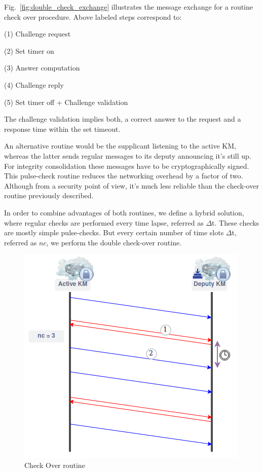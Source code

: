 Fig.~\ref{fig:double_check_exchange} illustrates the message exchange for a routine check over procedure. Above labeled steps correspond to:

\quad(1) Challenge request

\quad(2) Set timer on

\quad(3) Answer computation

\quad(4) Challenge reply

\quad(5) Set timer off + Challenge validation

The challenge validation implies both, a correct answer to the request and a response time within the set timeout.

An alternative routine would be the supplicant listening to the active KM, whereas the latter sends regular messages to its deputy announcing it’s still up. For integrity consolidation these messages have to be cryptographically signed. This pulse-check routine reduces the networking overhead by a factor of two. Although from a security point of view, it’s much less reliable than the check-over routine previously described.

In order to combine advantages of both routines, we define a hybrid solution, where regular checks are performed every time lapse, referred as $\Delta$t. These checks are mostly simple pulse-checks. But every certain number of time slots $\Delta$t, referred as $nc$, we perform the double check-over routine.

\begin{figure}[htbp]
	\centerline{\includegraphics[scale=0.50]{figures/check_routine.png}}
	\caption{Check Over routine}
	\label{fig:check_over_routine}
\end{figure}


